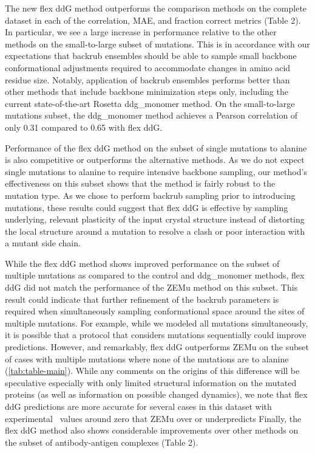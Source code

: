 The new flex ddG method outperforms the comparison methods on the complete dataset in each of the correlation, MAE, and fraction correct metrics (Table 2). In particular, we see a large increase in performance relative to the other methods on the small-to-large subset of mutations. This is in accordance with our expectations that backrub ensembles should be able to sample small backbone conformational adjustments required to accommodate changes in amino acid residue size. Notably, application of backrub ensembles performs better than other methods that include backbone minimization steps only, including the current state-of-the-art Rosetta ddg\_monomer method. On the small-to-large mutations subset, the ddg\_monomer method achieves a Pearson correlation of only 0.31 compared to 0.65 with flex ddG.

Performance of the flex ddG method on the subset of single mutations to alanine is also competitive or outperforms the alternative methods.
As we do not expect single mutations to alanine to require intensive backbone sampling, our method's effectiveness on this subset shows that the method is fairly robust to the mutation type.
As we chose to perform backrub sampling prior to introducing mutations, these results could suggest that flex ddG is effective by sampling underlying, relevant plasticity of the input crystal structure instead of distorting the local structure around a mutation to resolve a clash or poor interaction with a mutant side chain.

While the flex ddG method shows improved performance on the subset of multiple mutations as compared to the control and ddg\_monomer methods, flex ddG did not match the performance of the ZEMu method on this subset.
This result could indicate that further refinement of the backrub parameters is required when simultaneously sampling conformational space around the sites of multiple mutations.
For example, while we modeled all mutations simultaneously, it is possible that a protocol that considers mutations sequentially could improve predictions.
However, and remarkably, flex ddG outperforms ZEMu on the subset of cases with multiple mutations where none of the mutations are to alanine (\cref{tab:table-main}).
While any comments on the origins of this difference will be speculative especially with only limited structural information on the mutated proteins (as well as information on possible changed dynamics), we note that flex ddG predictions are more accurate for several cases in this dataset with experimental \ddg\ values around zero that ZEMu over or underpredicts
Finally, the flex ddG method also shows considerable improvements over other methods on the subset of antibody-antigen complexes (Table 2).

